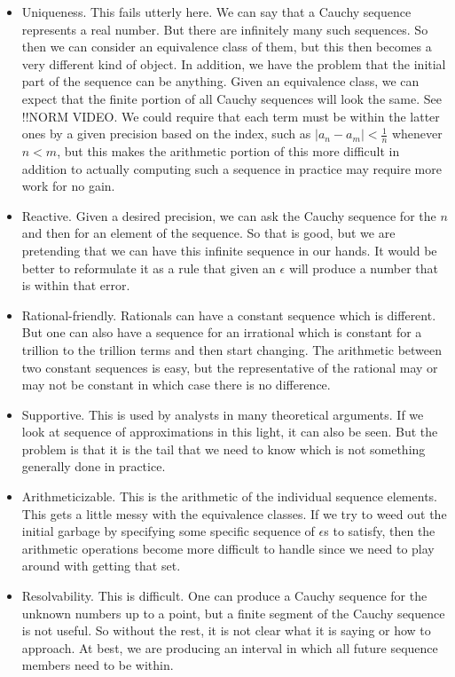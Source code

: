 \documentclass[12pt]{article}
\theoremstyle{remark}
\begin{document}
\begin{itemize}
    \item Uniqueness. This fails utterly here. We can say that a Cauchy sequence represents a real number. But there are infinitely many such sequences. So then we can consider an equivalence class of them, but this then becomes a very different kind of object. In addition, we have the problem that the initial part of the sequence can be anything. Given an equivalence class, we can expect that the finite portion of all Cauchy sequences will look the same. See !!NORM VIDEO.  We could require that each term must be within the latter ones by a given precision based on the index, such as $|a_n - a_m| < \tfrac{1}{n}$ whenever $n < m$, but this makes the arithmetic portion of this more difficult in addition to actually computing such a sequence in practice may require more work for no gain. 
    \item Reactive. Given a desired precision, we can ask the Cauchy sequence for the $n$ and then for an element of the sequence. So that is good, but we are pretending that we can have this infinite sequence in our hands. It would be better to reformulate it as a rule that given an $\epsilon$ will produce a number that is within that error. 
    \item Rational-friendly. Rationals can have a constant sequence which is different. But one can also have a sequence for an irrational which is constant for a trillion to the trillion terms and then start changing. The arithmetic between two constant sequences is easy, but the representative of the rational may or may not be constant in which case there is no difference. 
    \item Supportive. This is used by analysts in many theoretical arguments. If we look at sequence of approximations in this light, it can also be seen. But the problem is that it is the tail that we need to know which is not something generally done in practice. 
    \item Arithmeticizable. This is the arithmetic of the individual sequence elements. This gets a little messy with the equivalence classes. If we try to weed out the initial garbage by specifying some specific sequence of $\epsilon$s to satisfy, then the arithmetic operations become more difficult to handle since we need to play around with getting that set. 
    \item Resolvability. This is difficult. One can produce a Cauchy sequence for the unknown numbers up to a point, but a finite segment of the Cauchy sequence is not useful. So without the rest, it is not clear what it is saying or how to approach. At best, we are producing an interval in which all future sequence members need to be within. 
\end{itemize}
\end{document}
